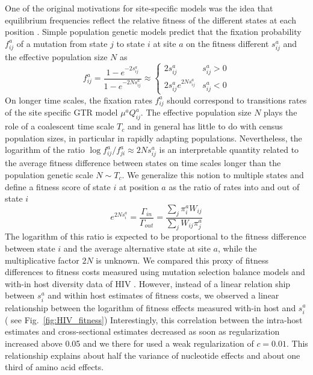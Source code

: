 \documentclass[aps,rmp,twocolumn]{revtex4}
\newcommand{\pc}{c}
\begin{document}
One of the original motivations for site-specific models was the idea that equilibrium frequencies reflect the relative fitness of the different states at each position \citep{halpern_evolutionary_1998}.
Simple population genetic models predict that the fixation probability $f_{ij}^a$ of a mutation from state $j$ to state $i$ at site $a$ on the fitness different $s^a_{ij}$ and the effective population size $N$ as \citep{kimura_diffusion_1964}
\begin{equation}
	f^a_{ij} = \frac{1-e^{-2s^a_{ij}}}{1-e^{-2Ns^a_{ij}}} \approx
	\begin{cases}
		2s^a_{ij} & s^a_{ij}>0 \\
		2s^a_{ij} e^{2Ns^a_{ij}} & s^a_{ij} < 0
	\end{cases}
\end{equation}
On longer time scales, the fixation rates $f^a_{ij}$ should correspond to transitions rates of the site specific GTR model $\mu^a Q^a_{ij}$.
The effective population size $N$ plays the role of a coalescent time scale $T_c$ and in general has little to do with census population sizes, in particular in rapidly adapting populations.
Nevertheless, the logarithm of the ratio $\log f^a_{ij}/f^a_{ji} \approx 2Ns^a_{ij}$ is an interpretable quantity related to the average fitness difference between states on time scales longer than the population genetic scale $N\sim T_c$.
We generalize this notion to multiple states and define a fitness score of state $i$ at position $a$ as the ratio of rates into and out of state $i$
\begin{equation}
	e^{2N s_i^a} = \frac{\Gamma_{in}}{\Gamma_{out}} = \frac{\sum_j \pi_i^a W_{ij}}{\sum_j W_{ij}\pi_j^a}
\end{equation}
The logarithm of this ratio is expected to be proportional to the fitness difference between state $i$ and the average alternative state at site $a$, while the multiplicative factor $2N$ is unknown.
We compared this proxy of fitness differences to fitness costs measured using mutation selection balance models and with-in host diversity data of HIV \citep{zanini2017vivo}.
However, instead of a linear relation ship between $s_i^a$ and within host estimates of fitness costs, we observed a linear relationship between the logarithm of fitness effects measured with-in host and $s_i^a$ (
see Fig.~\ref{fig:HIV_fitness})
Interestingly, this correlation between the intra-host estimates and cross-sectional estimates decreased as soon as regularization increased above 0.05 and we there for used a weak regularization of $\pc=0.01$.
This relationship explains about half the variance of nucleotide effects and about one third of amino acid effects.
\end{document}
